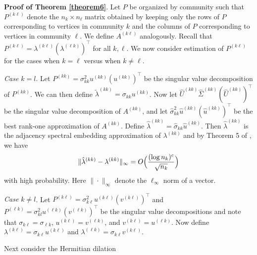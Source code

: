 \documentclass[12pt]{article}
\begin{document}
\textbf{Proof of Theorem \ref{theorem6}}. Let \(P\) be
organized by community such that \(P^{(k \ell)}\) denote the $n_k \times
n_{\ell}$ matrix obtained by keeping only the rows of $P$
corresponding to vertices in community $k$ and the columns of $P$
corresponding to vertices in community $\ell$. We define $A^{(k
  \ell)}$ analogously. Recall that $P^{(k \ell)} = \lambda^{(k \ell)} (\lambda^{(\ell k)})^{\top}$ for all $k, \ell$. We now consider estimation of $P^{(k \ell)}$
for the cases when $k = \ell$ versus when $k \not = \ell$.

\emph{Case \(k = l\)}. Let $P^{(kk)} =
\sigma_{kk}^2 u^{(kk)} (u^{(kk)})^\top$ be the singular value
decomposition of $P^{(kk)}$. We can then define
$\tilde{\lambda}^{(kk)} = \sigma_{kk} u^{(kk)}$. 
Now let $\hat{U}^{(kk)} \hat{\Sigma}^{(kk)} (\hat{U}^{(kk)})^\top$ be the
singular value decomposition of \(A^{(kk)}\), and let
$\hat{\sigma}_{kk}^2 \hat{u}^{(kk)} (\hat{u}^{(kk)})^\top$ be the
best rank-one approximation of $A^{(kk)}$. Define
\(\hat{\lambda}^{(kk)} = \hat{\sigma}_{kk} \hat{u}^{(kk)}\). Then
\(\hat{\lambda}^{(kk)}\) is the adjacency spectral embedding approximation of \(\lambda^{(kk)}\)
and by Theorem 5 of \citet{rubindelanchy2017statistical}, we have
$$\|\hat{\lambda}^{(kk)} - \lambda^{(kk)}\|_{\infty} = O\Bigl(\frac{(\log n_k)^c}{\sqrt{n_k}}\Bigr)$$
with high probability. 
Here $\|\cdot\|_{\infty}$ denote the $\ell_{\infty}$ norm of a vector.

\emph{Case \(k \neq l\)}. %
Let \(P^{(k \ell)} = \sigma_{k \ell}^2 u^{(k \ell)} (v^{(k \ell)})^\top\) and 
\(P^{(\ell k)} = \sigma_{kl}^2 u^{(\ell k)} (v^{(\ell k)})^\top\)  be the singular
value decompositions and note that \(\sigma_{k \ell} = \sigma_{\ell
  k}\), \(u^{(k \ell)} = v^{(\ell k)}\), and
\(v^{(k \ell)} = u^{(\ell k)}\). 
Now define \(\lambda^{(k \ell)} = \sigma_{k \ell} u^{(k \ell)}\) and
\(\lambda^{(\ell k)} = \sigma_{k \ell}
v^{(k \ell)}\).

Next consider the Hermitian dilation
\end{document}
